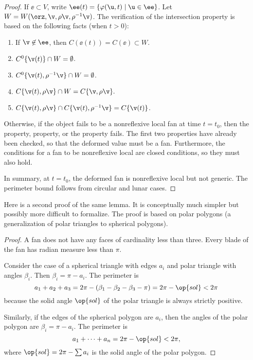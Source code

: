 \begin{proof}
  If $\ee\subset V$,
write $\ee(t) = \{\varphi(\u,t) \mid \u\in \ee\}$.  Let $W
=W(\orz,\v,\rho\v,\rho^{-1}\v)$. The verification of the intersection
property is based on the following facts (when $t>0$):
\begin{enumerate}\wasitemize  
\item If $\v\not\in \ee$, then $C(\ee(t))=C(\ee)\subset W$.
\item $C^0\{\v(t)\} \cap W = \emptyset$.
\item $C^0\{\v(t),\rho^{-1}\v\}\cap W = \emptyset$.
\item $C\{\v(t),\rho\v\}\cap W = C\{\v,\rho\v\}.$
\item $C\{\v(t),\rho\v\}\cap C\{\v(t),\rho^{-1}\v\} = C\{\v(t)\}$.
\end{enumerate}\wasitemize 

Otherwise, if the object fails to be a nonreflexive local fan at time
$t=t_0$, then the  property, 
property, or the  property fails.  The first two
properties have already been checked, so that the deformed value must
be a fan.  Furthermore, the conditions for a fan to be nonreflexive local
are closed conditions, so they must also hold.

In summary, at $t=t_0$, the deformed fan is nonreflexive local but not
generic.  The perimeter bound follows from circular and lunar cases.
\end{proof}

Here is a second proof of the same lemma.  It is conceptually much
simpler but possibly more difficult to formalize.  The proof is based
on polar polygons (a generalization of polar triangles to spherical
polygons).

\begin{proof} A fan does not have any faces of cardinality less than
three.  Every blade of the fan has radian measure less than $\pi$.
%

Consider the case of a spherical triangle with edges $a_i$
and polar triangle with angles $\beta_i$. Then $\beta_i=\pi-a_i$.
The perimeter is 
\[ a_1+a_2+a_3 = 2\pi - (\beta_1 -\beta_2 -
\beta_3-\pi)= 2\pi-\op{sol} < 2\pi\]  because the
solid angle $\op{sol}$ of the polar triangle is always strictly
positive.  %

Similarly, if the edges of the spherical polygon are
$a_i$, then the angles of the polar polygon are $\beta_i = \pi-a_i$.
The perimeter is
\[ 
a_1+\cdots+a_n  = 2\pi- \op{sol}< 2\pi,
\] 
where $\op{sol} = 2\pi-\sum a_i$ is the solid angle of the polar polygon.
%
\end{proof}


